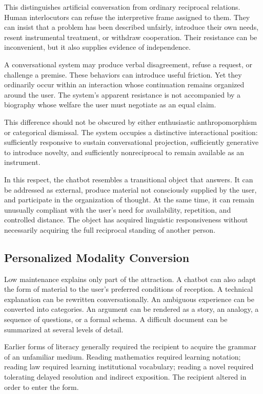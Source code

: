 \documentclass[11pt]{article}
\begin{document}
This distinguishes artificial conversation from ordinary reciprocal
relations. Human interlocutors can refuse the interpretive frame assigned to
them. They can insist that a problem has been described unfairly, introduce
their own needs, resent instrumental treatment, or withdraw cooperation.
Their resistance can be inconvenient, but it also supplies evidence of
independence.

A conversational system may produce verbal disagreement, refuse a request, or
challenge a premise. These behaviors can introduce useful friction. Yet they
ordinarily occur within an interaction whose continuation remains organized
around the user. The system's apparent resistance is not accompanied by a
biography whose welfare the user must negotiate as an equal claim.

This difference should not be obscured by either enthusiastic
anthropomorphism or categorical dismissal. The system occupies a distinctive
interactional position: sufficiently responsive to sustain conversational
projection, sufficiently generative to introduce novelty, and sufficiently
nonreciprocal to remain available as an instrument.

In this respect, the chatbot resembles a transitional object that answers.
It can be addressed as external, produce material not consciously supplied by
the user, and participate in the organization of thought. At the same time,
it can remain unusually compliant with the user's need for availability,
repetition, and controlled distance. The object has acquired linguistic
responsiveness without necessarily acquiring the full reciprocal standing of
another person.

\subsection{Personalized Modality Conversion}

Low maintenance explains only part of the attraction. A chatbot can also
adapt the form of material to the user's preferred conditions of reception.
A technical explanation can be rewritten conversationally. An ambiguous
experience can be converted into categories. An argument can be rendered as a
story, an analogy, a sequence of questions, or a formal schema. A difficult
document can be summarized at several levels of detail.

Earlier forms of literacy generally required the recipient to acquire the
grammar of an unfamiliar medium. Reading mathematics required learning
notation; reading law required learning institutional vocabulary; reading a
novel required tolerating delayed resolution and indirect exposition. The
recipient altered in order to enter the form.
\end{document}
